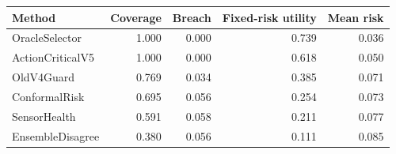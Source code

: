 \begin{tabular}{lrrrr}
\toprule
Method & Coverage & Breach & Fixed-risk utility & Mean risk \\
\midrule
OracleSelector & 1.000 & 0.000 & 0.739 & 0.036 \\
ActionCriticalV5 & 1.000 & 0.000 & 0.618 & 0.050 \\
OldV4Guard & 0.769 & 0.034 & 0.385 & 0.071 \\
ConformalRisk & 0.695 & 0.056 & 0.254 & 0.073 \\
SensorHealth & 0.591 & 0.058 & 0.211 & 0.077 \\
EnsembleDisagree & 0.380 & 0.056 & 0.111 & 0.085 \\
\bottomrule
\end{tabular}